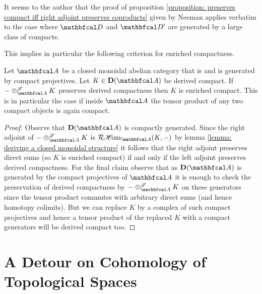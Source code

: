 \begin{remark}
	It seems to the author that the proof of proposition \ref{proposition: preserves compact iff right adjoint preserves coproducts} given by Neeman applies verbatim to the case where $\category{D}$ and $\category{D'}$ are generated by a large class of compacts.
\end{remark}


This implies in particular the following criterion for enriched compactness.
\begin{corollary}
	\label{corollary: a sufficient condition for enriched compactness}
	
	Let $\category{A}$ be a closed monoidal abelian category that is  and is generated by compact projectives. Let $K \in \derived{\category{A}}$ be derived compact. If $-\Dotimes_\category{A} K$ preserves derived compactness then $K$ is enriched compact. This is in particular the case if inside $\category{A}$ the tensor product of any two compact objects is again compact.
\end{corollary}
\begin{proof}
	Observe that $\derived{\category{A}}$ is compactly generated. Since the right adjoint of $-\Dotimes_\category{A} K$ is $\intRHom_\category{A}(K, -)$ by lemma \ref{lemma: deriving a closed monoidal structure} it follows that the right adjoint preserves direct sums (so $K$ is enriched compact) if and only if the left adjoint preserves derived compactness. For the final claim observe that as $\derived{\category{A}}$ is generated by the compact projectives of $\category{A}$ it is enough to check the preservation of derived compactness by $-\Dotimes_\category{A} K$ on these generators since the tensor product commutes with arbitrary direct sums (and hence homotopy colimits). But we can replace $K$ by a complex of such compact projectives and hence a tensor product of the replaced $K$ with a compact generators will be derived compact too.
\end{proof}

\section{A Detour on Cohomology of Topological Spaces}

